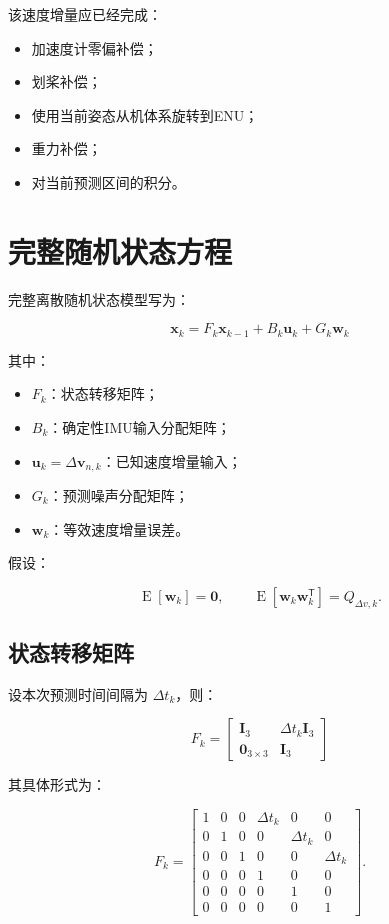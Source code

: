 \documentclass[12pt,a4paper]{ctexart}
\newcommand{\I}{\mathbf I}
\newcommand{\zero}{\mathbf 0}
\newcommand{\transpose}{^{\mathsf T}}
\newcommand{\E}{\operatorname{E}}
\begin{document}
该速度增量应已经完成：

\begin{itemize}[leftmargin=2em]
  \item 加速度计零偏补偿；
  \item 划桨补偿；
  \item 使用当前姿态从机体系旋转到ENU；
  \item 重力补偿；
  \item 对当前预测区间的积分。
\end{itemize}

\section{完整随机状态方程}

完整离散随机状态模型写为：

\[
\boxed{
\mathbf x_k =
F_k\mathbf x_{k-1}
+
B_k\mathbf u_k
+
G_k\mathbf w_k
}
\]

其中：

\begin{itemize}[leftmargin=2em]
  \item $F_k$：状态转移矩阵；
  \item $B_k$：确定性IMU输入分配矩阵；
  \item $\mathbf u_k=\Delta\mathbf v_{n,k}$：已知速度增量输入；
  \item $G_k$：预测噪声分配矩阵；
  \item $\mathbf w_k$：等效速度增量误差。
\end{itemize}

假设：

\[
\E[\mathbf w_k] = \zero,
\qquad
\E[\mathbf w_k\mathbf w_k\transpose] = Q_{\Delta v,k}.
\]

\subsection{状态转移矩阵}

设本次预测时间间隔为 $\Delta t_k$，则：

\[
\boxed{
F_k =
\begin{bmatrix}
\I_3 & \Delta t_k\I_3\\
\zero_{3\times3} & \I_3
\end{bmatrix}
}
\]

其具体形式为：

\[
F_k =
\begin{bmatrix}
1&0&0&\Delta t_k&0&0\\
0&1&0&0&\Delta t_k&0\\
0&0&1&0&0&\Delta t_k\\
0&0&0&1&0&0\\
0&0&0&0&1&0\\
0&0&0&0&0&1
\end{bmatrix}.
\]
\end{document}
